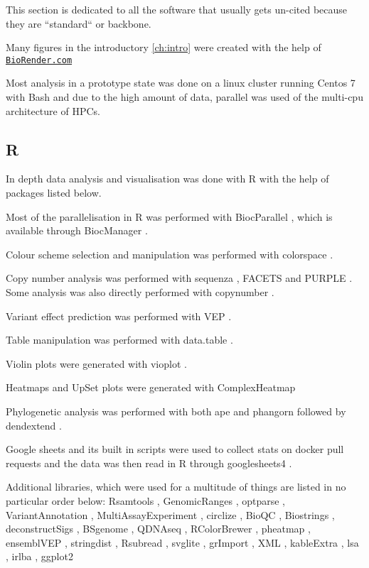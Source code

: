 {This section is dedicated to all the software that usually gets un-cited because they are ``standard`` or backbone.

Many figures in the introductory \autoref{ch:intro} were created with the help of \href{https://BioRender.com}{\nolinkurl{BioRender.com}} 


Most analysis in a prototype state was done on a linux cluster running Centos 7 \cite{CentosProject2014} with Bash \cite{FSF2007} and due to the high amount of data, parallel \cite{Tange2011} was used of the multi-cpu architecture of HPCs.

\subsection*{R}
In depth data analysis and visualisation was done with R \cite{RCT2021} with the help of packages listed below.


Most of the parallelisation in R was performed with BiocParallel \cite{Morgan2020}, which is available through BiocManager \cite{Morgan2019}.

Colour scheme selection and manipulation was performed with colorspace \cite{Zeileis2009,Zeileis2020}.

Copy number analysis was performed with sequenza \cite{Favero2015}, FACETS \cite{Shen2016,Seshan2018} and PURPLE \cite{Cameron2019a}. Some analysis was also directly performed with copynumber \cite{Nilsen2012,Nilsen2021}.

Variant effect prediction was performed with VEP \cite{McLaren2016}.

Table manipulation was performed with data.table \cite{Dowle2021}.

Violin plots were generated with vioplot \cite{Adler2020}.

Heatmaps and UpSet plots were generated with ComplexHeatmap \cite{Gu2016}

Phylogenetic analysis was performed with both ape \cite{Paradis2018} and phangorn \cite{Schliep2017} followed by dendextend \cite{Galili2015}.

Google sheets and its built in scripts were used to collect stats on docker pull requests and the data was then read in R through googlesheets4 \cite{Bryan2021}.

Additional libraries, which were used for a multitude of things are listed in no particular order below: Rsamtools \cite{Morgan2021}, GenomicRanges \cite{Lawrence2013}, optparse \cite{Davis2020}, VariantAnnotation \cite{Obenchain2014}, MultiAssayExperiment \cite{Ramos2017}, circlize \cite{Gu2014}, BioQC \cite{Zhang2017}, Biostrings \cite{Pages2020}, deconstructSigs \cite{Rosenthal2016}, BSgenome \cite{Pages2020a}, QDNAseq \cite{Scheinin2014}, RColorBrewer \cite{Neuwirth2014}, pheatmap \cite{Kolde2019}, ensemblVEP \cite{Obenchain2020}, stringdist \cite{vanderLoo2014}, Rsubread \cite{Liao2019}, svglite \cite{Wickham2021}, grImport \cite{Murrell2009}, XML \cite{TempleLang2020}, kableExtra \cite{Zhu2021}, lsa \cite{Wild2020}, irlba \cite{Baglama2019}, ggplot2 \cite{Wickham2016}


}
